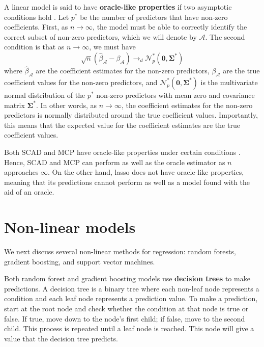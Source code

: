 \documentclass{article}
\begin{document}
A linear model is said to have \textbf{oracle-like properties} if two asymptotic conditions hold \cite{zou2006adaptive}. Let $p^\ast$ be the number of predictors that have non-zero coefficients. First, as $n\to \infty$, the model must be able to correctly identify the correct subset of non-zero predictors, which we will denote by $\mathcal{A}$. The second condition is that as $n\to\infty$, we must have
\begin{equation}
	\sqrt{n}(\hat{\beta}_\mathcal{A} - \beta_\mathcal{A})\to_d \mathcal{N}_p^{\ast}(\mathbf{0}, \mathbf{\Sigma}^\ast)
\end{equation}
where $\hat{\beta}_\mathcal{A}$ are the coefficient estimates for the non-zero predictors, $\beta_\mathcal{A}$ are the true coefficient values for the non-zero predictors, and $\mathcal{N}_p^\ast(\mathbf{0}, \mathbf{\Sigma}^\ast)$ is the multivariate normal distribution of the $p^\ast$ non-zero predictors with mean zero and covariance matrix $\mathbf{\Sigma}^\ast$. In other words, as $n\to\infty$, the coefficient estimates for the non-zero predictors is normally distributed around the true coefficient values. Importantly, this means that the expected value for the coefficient estimates are the true coefficient values.

Both SCAD and MCP have oracle-like properties under certain conditions \cite{fan2001variable, zhang2010nearly}. Hence, SCAD and MCP can perform as well as the oracle estimator as $n$ approaches $\infty$. On the other hand, lasso does not have oracle-like properties, meaning that its predictions cannot perform as well as a model found with the aid of an oracle.

\section{Non-linear models}
We next discuss several non-linear methods for regression: random forests, gradient boosting, and support vector machines.

Both random forest and gradient boosting models use \textbf{decision trees} to make predictions. A decision tree is a binary tree where each non-leaf node represents a condition and each leaf node represents a prediction value. To make a prediction, start at the root node and check whether the condition at that node is true or false. If true, move down to the node's first child; if false, move to the second child. This process is repeated until a leaf node is reached. This node will give a value that the decision tree predicts.
\end{document}
